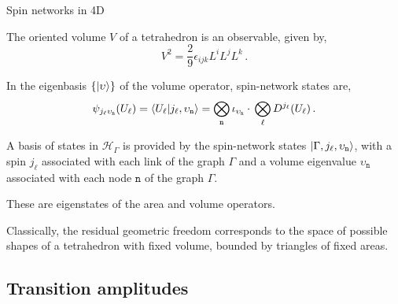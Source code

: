 \documentclass{beamer}
\begin{document}
\begin{frame}{Spin networks in 4D}
    \begin{list}{\maltese}{\leftmargin=1em \itemindent=0em}
        \item<1-> The oriented volume $V$ of a tetrahedron is an observable, given by,
        \begin{equation}
            V^2=\frac{2}{9}\epsilon_{ijk}L^i L^j L^k \,.
        \end{equation}
        \item<2-> In the eigenbasis $\{\ket{\upsilon}\}$ of the volume operator, spin-network states are,
        \begin{equation}
            \psi_{j_\ell \upsilon_\mathtt{n}}(U_\ell)= \braket{U_\ell}{j_\ell,\upsilon_\mathtt{n}}=\bigotimes_\mathtt{n}\iota_{\upsilon_\mathtt{n}}\cdot\,\bigotimes_\ell D^{j_\ell}(U_\ell)\,.
        \end{equation}
        \item<3-> A basis of states in $\mathcal{H}_\Gamma$ is provided by the spin-network states $\ket{\Gamma,j_\ell,\upsilon_\mathtt{n}}$, with a spin $j_\ell$ associated with each link of the graph $\Gamma$ and a volume eigenvalue $\upsilon_\mathtt{n}$ associated with each node $\mathtt{n}$ of the graph $\Gamma$.
        \item<4-> These are eigenstates of the area and volume operators.
        \item<5-> Classically, the residual geometric freedom corresponds to the space of possible shapes of a tetrahedron with fixed volume, bounded by triangles of fixed areas.
    \end{list}
\end{frame}

\subsection{Transition amplitudes}
\end{document}
